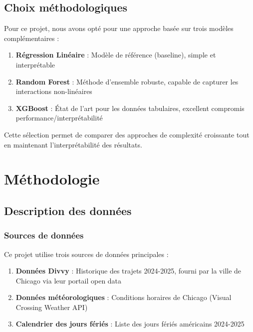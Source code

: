 \documentclass[12pt,a4paper]{article}
\begin{document}
\subsection{Choix méthodologiques}

Pour ce projet, nous avons opté pour une approche basée sur trois modèles complémentaires :

\begin{enumerate}
    \item \textbf{Régression Linéaire} : Modèle de référence (baseline), simple et interprétable
    \item \textbf{Random Forest} : Méthode d'ensemble robuste, capable de capturer les interactions non-linéaires
    \item \textbf{XGBoost} : État de l'art pour les données tabulaires, excellent compromis performance/interprétabilité
\end{enumerate}

Cette sélection permet de comparer des approches de complexité croissante tout en maintenant l'interprétabilité des résultats.

\section{Méthodologie}

\subsection{Description des données}

\subsubsection{Sources de données}

Ce projet utilise trois sources de données principales :

\begin{enumerate}
    \item \textbf{Données Divvy} : Historique des trajets 2024-2025, fourni par la ville de Chicago via leur portail open data
    \item \textbf{Données météorologiques} : Conditions horaires de Chicago (Visual Crossing Weather API)
    \item \textbf{Calendrier des jours fériés} : Liste des jours fériés américains 2024-2025
\end{enumerate}
\end{document}
